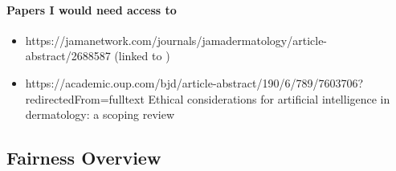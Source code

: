 \documentclass[12pt, a4paper, oneside]{book}   	%
\newif\ifrawcitationactive
\newcommand{\rawcitationend}{\color{black}\rawcitationactivefalse}
\begin{document}
			\paragraph{Papers I would need access to}
			\begin{itemize}
				\item https://jamanetwork.com/journals/jamadermatology/article-abstract/2688587 (linked to \autocite{Young_2020})
				\item https://academic.oup.com/bjd/article-abstract/190/6/789/7603706?redirectedFrom=fulltext Ethical considerations for artificial intelligence in dermatology: a scoping review
				
			\end{itemize}
			\rawcitationend
			
		    \subsection{Fairness Overview}
\end{document}

